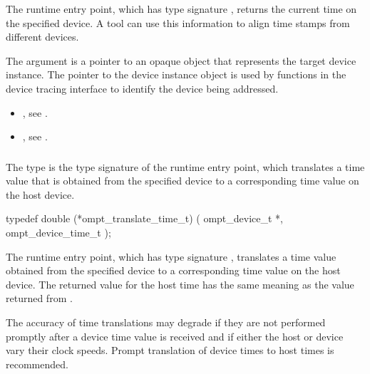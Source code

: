 The  runtime entry point, which has type 
signature , returns the current time on 
the specified device. A tool can use this information to align time 
stamps from different devices.

\argdesc
The  argument is a pointer to an opaque object that
represents the target device instance. The pointer to the device
instance object is used by functions in the device tracing interface
to identify the device being addressed.

\crossreferences
\begin{itemize}
\item {}, see .

\item {}, see .
\end{itemize}



\subsubsection{}
\label{sec:ompt_translate_time_t}

\summary
The  type is the type signature of the 
 runtime entry point, which translates a 
time value that is obtained from the specified device to a corresponding 
time value on the host device.

\format
\begin{ccppspecific}
\begin{omptInquiry}
typedef double (*ompt_translate_time_t) (
  ompt_device_t *,
  ompt_device_time_t 
);
\end{omptInquiry}
\end{ccppspecific}

\descr
The  runtime entry point, which has type signature 
, translates a time value obtained from the specified 
device to a corresponding time value on the host device. The returned value for 
the host time has the same meaning as the value returned from .

\begin{note}
The accuracy of time translations may degrade if they are not performed promptly 
after a device time value is received and if either the host or device vary their 
clock speeds. Prompt translation of device times to host times is recommended.
\end{note}

